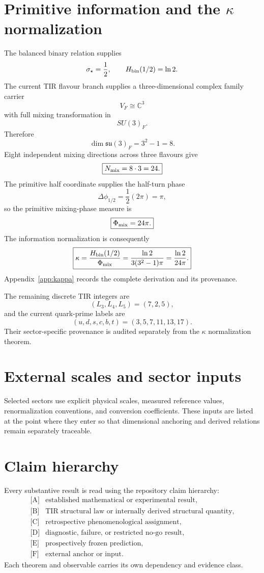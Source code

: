 \section{Primitive information and the $\kappa$ normalization}
The balanced binary relation supplies
\[
\sigma_\star=\frac12,
\qquad
H_{\rm bin}(1/2)=\ln2.
\]
The current TIR flavour branch supplies a three-dimensional complex family
carrier
\[
V_F\cong\mathbb C^3
\]
with full mixing transformation in
\[
SU(3)_F.
\]
Therefore
\[
\dim\mathfrak{su}(3)_F=3^2-1=8.
\]
Eight independent mixing directions across three flavours give
\[
\boxed{N_{\rm mix}=8\cdot3=24.}
\]
The primitive half coordinate supplies the half-turn phase
\[
\Delta\phi_{1/2}=\frac12(2\pi)=\pi,
\]
so the primitive mixing-phase measure is
\[
\boxed{\Phi_{\rm mix}=24\pi.}
\]
The information normalization is consequently
\begin{equation}
  \boxed{
  \kappa
  =\frac{H_{\rm bin}(1/2)}{\Phi_{\rm mix}}
  =\frac{\ln2}{3(3^2-1)\pi}
  =\frac{\ln2}{24\pi}.}
  \label{eq:kappa_def}
\end{equation}
Appendix~\ref{app:kappa} records the complete derivation and its provenance.

The remaining discrete TIR integers are
\[
(L_3,L_4,L_5)=(7,2,5),
\]
and the current quark-prime labels are
\begin{equation}
  (u,d,s,c,b,t)=(3,5,7,11,13,17).
  \label{eq:quark_primes_def}
\end{equation}
Their sector-specific provenance is audited separately from the $\kappa$
normalization theorem.

\section{External scales and sector inputs}
Selected sectors use explicit physical scales, measured reference values,
renormalization conventions, and conversion coefficients. These inputs are
listed at the point where they enter so that dimensional anchoring and derived
relations remain separately traceable.

\section{Claim hierarchy}
Every substantive result is read using the repository claim hierarchy:
\[
\begin{array}{ll}
  \text{[A]} & \text{established mathematical or experimental result},\\
  \text{[B]} & \text{TIR structural law or internally derived structural quantity},\\
  \text{[C]} & \text{retrospective phenomenological assignment},\\
  \text{[D]} & \text{diagnostic, failure, or restricted no-go result},\\
  \text{[E]} & \text{prospectively frozen prediction},\\
  \text{[F]} & \text{external anchor or input}.
\end{array}
\]
Each theorem and observable carries its own dependency and evidence class.

